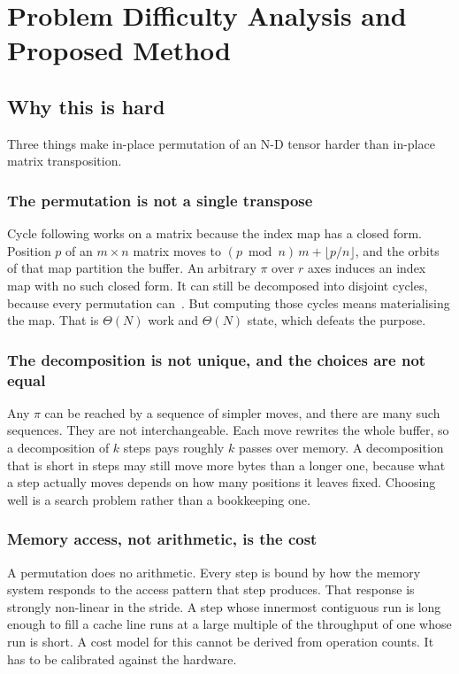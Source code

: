 \section{Problem Difficulty Analysis and Proposed Method}
\label{sec:method}

\subsection{Why this is hard}
\label{sec:difficulty}

Three things make in-place permutation of an N-D tensor harder than in-place
matrix transposition.

\subsubsection{The permutation is not a single transpose}

Cycle following works on a matrix because the index map has a closed form.
Position $p$ of an $m \times n$ matrix moves to
$(p \bmod n)\,m + \lfloor p/n \rfloor$, and the orbits of that map partition
the buffer. An arbitrary $\pi$ over $r$ axes induces an index map with no such
closed form. It can still be decomposed into disjoint
cycles, because every permutation can~\cite{dummit2003abstract}. But computing
those cycles means materialising the map. That is $\Theta(N)$ work and
$\Theta(N)$ state, which defeats the purpose.

\subsubsection{The decomposition is not unique, and the choices are not equal}

Any $\pi$ can be reached by a sequence of simpler moves, and there are many
such sequences. They are not interchangeable. Each move rewrites the whole
buffer, so a decomposition of $k$ steps pays roughly $k$ passes over memory.
A decomposition that is short in steps may still move more bytes than a longer
one, because what a step actually moves depends on how many positions it
leaves fixed. Choosing well is a search problem rather than a bookkeeping one.

\subsubsection{Memory access, not arithmetic, is the cost}

A permutation does no arithmetic. Every step is bound by how the memory system
responds to the access pattern that step produces. That response is strongly
non-linear in the stride. A step whose innermost contiguous run is long enough
to fill a cache line runs at a large multiple of the throughput of one whose
run is short. A cost model for this cannot be derived from operation counts.
It has to be calibrated against the hardware.

